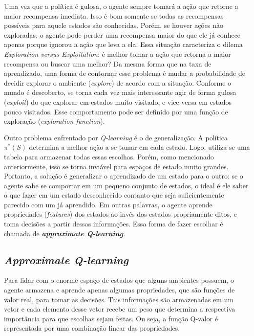 Uma vez que a política é gulosa, o agente sempre tomará a ação que retorne a maior recompensa imediata. Isso é bom somente se todas as recompensas possíveis para aquele estados são conhecidas. Porém, se houver ações não exploradas, o agente pode perder uma recompensa maior do que ele já conhece apenas porque ignorou a ação que leva a ela. Essa situação caracteriza o dilema \textit{Exploration versus Exploitation}: é melhor tomar a ação que retorna a maior recompensa ou buscar uma melhor? Da mesma forma que na taxa de aprendizado, uma forma de contornar esse problema é mudar a probabilidade de decidir explorar o ambiente (\textit{explore}) de acordo com a situação. Conforme o mundo é descoberto, se torna cada vez mais interessante agir de forma gulosa (\textit{exploit}) do que explorar em estados muito visitado, e vice-versa em estados pouco visitados. Esse comportamento pode ser definido por uma função de exploração (\textit{exploration function}).

Outro problema enfrentado por \textit{Q-learning} é o de generalização. A política $\pi^{*}(S)$ determina a melhor ação a se tomar em cada estado. Logo, utiliza-se uma tabela para armazenar todas essas escolhas. Porém, como mencionado anteriormente, isso se torna inviável para espaços de estado muito grandes. Portanto, a solução é generalizar o aprendizado de um estado para o outro: se o agente sabe se comportar em um pequeno conjunto de estados, o ideal é ele saber o que fazer em um estado desconhecido contanto que seja suficientemente parecido com um já aprendido. Em outras palavras, o agente aprende propriedades (\textit{features}) dos estados ao invés dos estados propriamente ditos, e toma decisões a partir dessas informações. Essa forma de fazer escolhar é chamada de \textit{\textbf{approximate Q-learning}}.

\subsection{\textit{Approximate Q-learning}}
\label{sec:aql}

Para lidar com o enorme espaço de estados que alguns ambientes possuem, o agente armazena e aprende apenas algumas propriedades, que são funções de valor real, para tomar as decisões. Tais informações são armazenadas em um vetor e cada elemento desse vetor recebe um peso que determina a respectiva importância para que escolhas sejam feitas. Ou seja, a função Q-valor é representada por uma combinação linear das propriedades.

